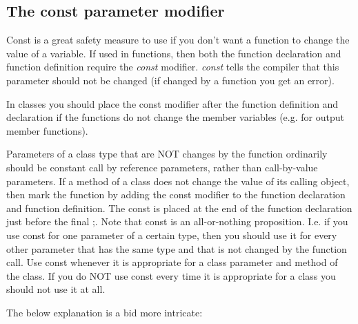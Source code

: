\subsection{The const parameter modifier}
Const is a great safety measure to use if you don't want a function to change the value of a variable.
If used in functions, then both the function declaration and function definition require the
\emph{const} modifier. \emph{const} tells the compiler that this parameter should not be
changed (if changed by a function you get an error).

In classes you should place the const modifier after the function definition and declaration
if the functions do not change the member variables (e.g. for output member functions).

Parameters of a class type that are NOT changes by the function ordinarily should be constant
call by reference parameters, rather than call-by-value parameters. If a method of a class does not change
the value of its calling object, then mark the function by adding the const modifier to the
function declaration and function definition. The const is placed at the end of the function declaration
just before the final ;. Note that const is an all-or-nothing proposition. I.e. if you use const for one parameter
of a certain type, then you should use it for every other parameter that has the same
type and that is not changed by the function call. Use const whenever it is appropriate for a class parameter
and method of the class. If you do NOT use const every time it is appropriate for a
class you should not use it at all.


The below explanation is a bid more intricate:

